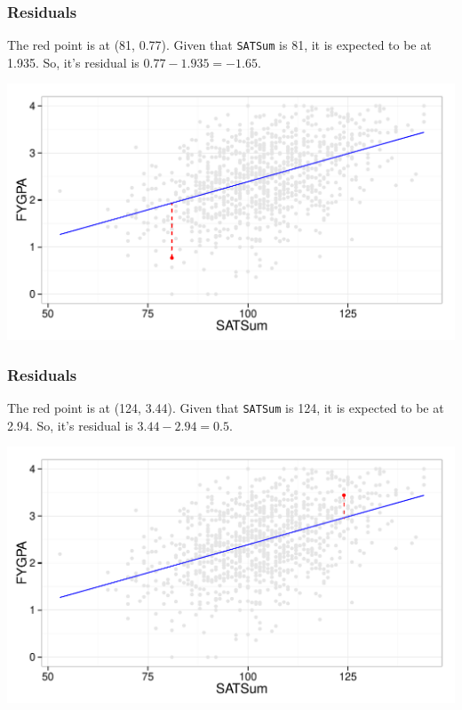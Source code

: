 \documentclass{beamer}\usepackage{graphicx, color}
\makeatletter
\def\maxwidth{ %
  \ifdim\Gin@nat@width>\linewidth
    \linewidth
  \else
    \Gin@nat@width
  \fi
}
\newenvironment{knitrout}{}{} %
\makeatother
\begin{document}
\begin{frame}[fragile]
  \frametitle{Residuals}
  The red point is at (81, 0.77). Given that \texttt{SATSum} is 81, it is expected to be at 1.935. So, it's residual is $0.77 - 1.935 = -1.65$.
\begin{knitrout}
\color{fgcolor}

{\centering \includegraphics[width=\maxwidth]{figure/Res1} 

}


\end{knitrout}

\end{frame}

\begin{frame}[fragile]
  \frametitle{Residuals}
  The red point is at (124, 3.44). Given that \texttt{SATSum} is 124, it is expected to be at 2.94. So, it's residual is $3.44 - 2.94 = 0.5$.
\begin{knitrout}
\color{fgcolor}

{\centering \includegraphics[width=\maxwidth]{figure/Res2} 

}


\end{knitrout}

\end{frame}
\end{document}
